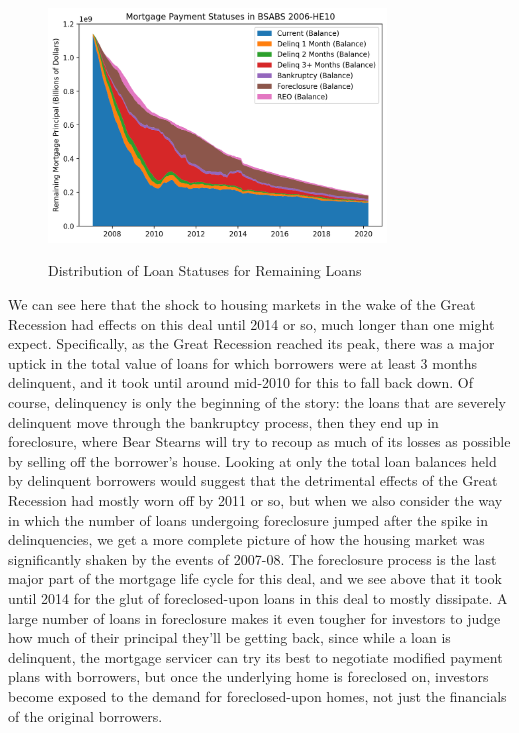\documentclass[12pt]{article}
\begin{document}
\begin{figure}[h]
	\centering
	\caption{Distribution of Loan Statuses for Remaining Loans}
	\includegraphics[width=0.8\textwidth]{../figures/stackplot_delinq_status}
	\label{fig:stackplot_delinq_status}
\end{figure}

We can see here that the shock to housing markets in the wake of the Great Recession had effects on this deal until 2014 or so, much longer than one might expect. Specifically, as the Great Recession reached its peak, there was a major uptick in the total value of loans for which borrowers were at least 3 months delinquent, and it took until around mid-2010 for this to fall back down. Of course, delinquency is only the beginning of the story: the loans that are severely delinquent move through the bankruptcy process, then they end up in foreclosure, where Bear Stearns will try to recoup as much of its losses as possible by selling off the borrower’s house. Looking at only the total loan balances held by delinquent borrowers would suggest that the detrimental effects of the Great Recession had mostly worn off by 2011 or so, but when we also consider the way in which the number of loans undergoing foreclosure jumped after the spike in delinquencies, we get a more complete picture of how the housing market was significantly shaken by the events of 2007-08. The foreclosure process is the last major part of the mortgage life cycle for this deal, and we see above that it took until 2014 for the glut of foreclosed-upon loans in this deal to mostly dissipate. A large number of loans in foreclosure makes it even tougher for investors to judge how much of their principal they’ll be getting back, since while a loan is delinquent, the mortgage servicer can try its best to negotiate modified payment plans with borrowers, but once the underlying home is foreclosed on, investors become exposed to the demand for foreclosed-upon homes, not just the financials of the original borrowers.
\end{document}
